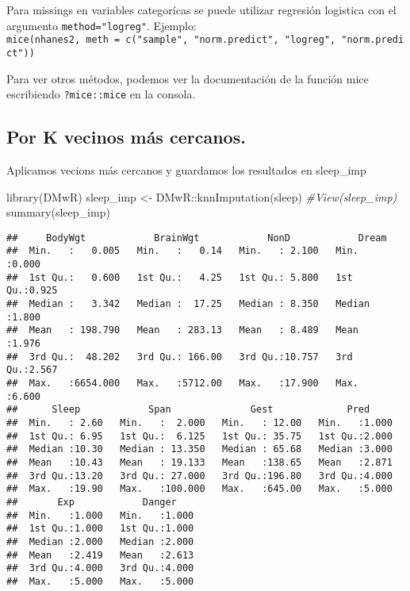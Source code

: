 \documentclass[
]{article}
\newenvironment{Shaded}{\begin{snugshade}}{\end{snugshade}}
\newcommand{\CommentTok}[1]{\textcolor[rgb]{0.56,0.35,0.01}{\textit{#1}}}
\newcommand{\FunctionTok}[1]{\textcolor[rgb]{0.00,0.00,0.00}{#1}}
\newcommand{\NormalTok}[1]{#1}
\newcommand{\OtherTok}[1]{\textcolor[rgb]{0.56,0.35,0.01}{#1}}
\newcommand{\SpecialCharTok}[1]{\textcolor[rgb]{0.00,0.00,0.00}{#1}}
\begin{document}
Para missings en variables categorícas se puede utilizar regresión
logistica con el argumento \texttt{method="logreg"}. Ejemplo:
\texttt{mice(nhanes2,\ meth\ =\ c("sample",\ "norm.predict",\ "logreg",\ "norm.predict"))}

Para ver otros métodos, podemos ver la documentación de la función mice
escribiendo \texttt{?mice::mice} en la consola.

\hypertarget{por-k-vecinos-muxe1s-cercanos.}{%
\subsection{Por K vecinos más
cercanos.}\label{por-k-vecinos-muxe1s-cercanos.}}

Aplicamos vecions más cercanos y guardamos los resultados en sleep\_imp

\begin{Shaded}
\begin{Highlighting}[]
\FunctionTok{library}\NormalTok{(DMwR)}
\NormalTok{sleep\_imp }\OtherTok{\textless{}{-}}\NormalTok{ DMwR}\SpecialCharTok{::}\FunctionTok{knnImputation}\NormalTok{(sleep)}
\CommentTok{\#View(sleep\_imp)}
\FunctionTok{summary}\NormalTok{(sleep\_imp)}
\end{Highlighting}
\end{Shaded}

\begin{verbatim}
##     BodyWgt            BrainWgt            NonD            Dream      
##  Min.   :   0.005   Min.   :   0.14   Min.   : 2.100   Min.   :0.000  
##  1st Qu.:   0.600   1st Qu.:   4.25   1st Qu.: 5.800   1st Qu.:0.925  
##  Median :   3.342   Median :  17.25   Median : 8.350   Median :1.800  
##  Mean   : 198.790   Mean   : 283.13   Mean   : 8.489   Mean   :1.976  
##  3rd Qu.:  48.202   3rd Qu.: 166.00   3rd Qu.:10.757   3rd Qu.:2.567  
##  Max.   :6654.000   Max.   :5712.00   Max.   :17.900   Max.   :6.600  
##      Sleep            Span              Gest             Pred      
##  Min.   : 2.60   Min.   :  2.000   Min.   : 12.00   Min.   :1.000  
##  1st Qu.: 6.95   1st Qu.:  6.125   1st Qu.: 35.75   1st Qu.:2.000  
##  Median :10.30   Median : 13.350   Median : 65.68   Median :3.000  
##  Mean   :10.43   Mean   : 19.133   Mean   :138.65   Mean   :2.871  
##  3rd Qu.:13.20   3rd Qu.: 27.000   3rd Qu.:196.80   3rd Qu.:4.000  
##  Max.   :19.90   Max.   :100.000   Max.   :645.00   Max.   :5.000  
##       Exp            Danger     
##  Min.   :1.000   Min.   :1.000  
##  1st Qu.:1.000   1st Qu.:1.000  
##  Median :2.000   Median :2.000  
##  Mean   :2.419   Mean   :2.613  
##  3rd Qu.:4.000   3rd Qu.:4.000  
##  Max.   :5.000   Max.   :5.000
\end{verbatim}
\end{document}
